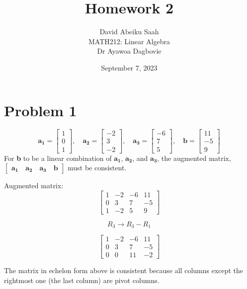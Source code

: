 \documentclass[12pt, a4paper]{article}
\title{
    \textbf{Homework 2} \\ \vspace{1cm}
}
\author{
\vspace*{0.5cm}
    David Abeiku Saah \\ \vspace{0.4cm}
    MATH212: Linear Algebra \\ \vspace{0.5cm}
    Dr Ayawoa Dagbovie \\
}
\date{September 7, 2023}
\begin{document}
\maketitle

\newpage

\section*{Problem 1}
\[
\boldsymbol{a_1}  = \begin{bmatrix}
        1 \\
        0 \\
        1
    \end{bmatrix}, \quad
\boldsymbol{a_2}  = \begin{bmatrix}
       -2 \\
        3 \\
       -2
\end{bmatrix}, \quad
\boldsymbol{a_3}  = \begin{bmatrix}
       -6 \\
        7 \\
        5
\end{bmatrix}, \quad
\boldsymbol{b}  = \begin{bmatrix}
        11 \\
       -5 \\
        9
\end{bmatrix}
\]
For \textbf{b} to be a linear combination of $\boldsymbol{a_1}$, $\boldsymbol{a_2}$, and $\boldsymbol{a_3}$, the augmented matrix, $\begin{bmatrix} \boldsymbol{a_1} \quad  \boldsymbol{a_2} \quad \boldsymbol{a_3} \quad \boldsymbol{b} \end{bmatrix}$ must be consistent.

Augmented matrix:
\[
\begin{bmatrix}
    1 & -2 & -6 & 11 \\
    0 & 3 & 7 & -5 \\
    1 & -2 & 5 & 9
\end{bmatrix}
\]

\[R_3 \rightarrow R_3 - R_1\]

\[
\begin{bmatrix}
    1 & -2 & -6 & 11 \\
    0 & 3 & 7 & -5 \\
    0 & 0 & 11 & -2
\end{bmatrix}
\]

The matrix in echelon form above is consistent because all columns except the rightmost one (the last column) are pivot columns.
\end{document}
